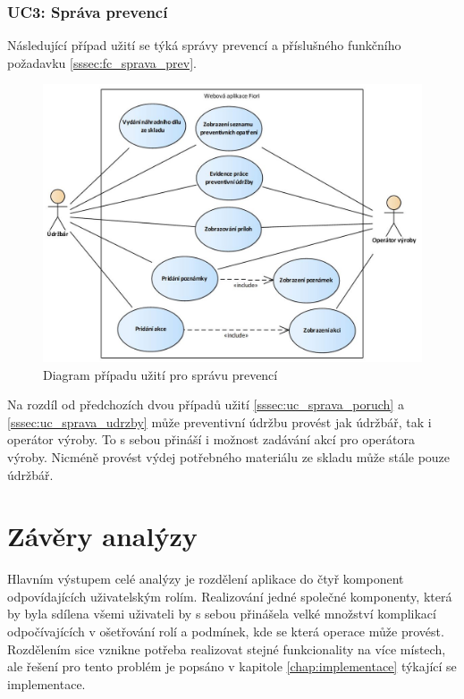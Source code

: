 \documentclass[thesis=M,czech]{FITthesis}[2012/06/26]
\begin{document}
\subsubsection{UC3: Správa prevencí}
\label{sssec:uc_sprava_prevenci}
Následující případ užití se týká správy prevencí a příslušného funkčního požadavku \ref{sssec:fc_sprava_prev}.
\begin{figure}[H]
	\centering
	\includegraphics[width=1\textwidth]{images/ea_sprava_prevenci}
	\caption{Diagram případu užití pro správu prevencí}
	\label{img:uc_prevence}
\end{figure}
Na rozdíl od předchozích dvou případů užití \ref{sssec:uc_sprava_poruch} a \ref{sssec:uc_sprava_udrzby} může preventivní údržbu provést jak údržbář, tak i operátor výroby. To s sebou přináší i možnost zadávání akcí pro operátora výroby. Nicméně provést výdej potřebného materiálu ze skladu může stále pouze údržbář. 
\section{Závěry analýzy}
\label{sec:zav_analyzy}
Hlavním výstupem celé analýzy je rozdělení aplikace do čtyř komponent odpovídajících uživatelským rolím. Realizování jedné společné komponenty, která by byla sdílena všemi uživateli by s sebou přinášela velké množství komplikací odpočívajících v ošetřování rolí a podmínek, kde se která operace může provést. Rozdělením sice vznikne potřeba realizovat stejné funkcionality na více místech, ale řešení pro tento problém je popsáno v kapitole \ref{chap:implementace} týkající se implementace.

\end{document}
